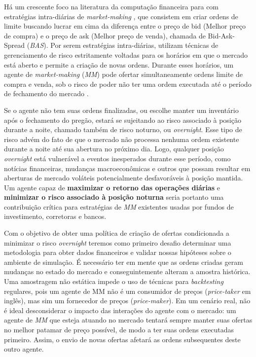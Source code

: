 Há um crescente foco na literatura da computação financeira para com estratégias intra-diárias de \textit{market-making} \citep{Gueant2017}, que consistem em criar ordens de limite buscando lucrar em cima da diferença entre o preço de bid (Melhor preço de compra) e o preço de ask (Melhor preço de venda), chamada de Bid-Ask-Spread (\textit{BAS}). Por serem estratégias intra-diárias, utilizam técnicas de gerenciamento de risco estritamente voltadas para os horários em que o mercado está aberto e permite a criação de novas ordens. Durante esses horários, um agente de \textit{market-making} (\textit{MM}) pode ofertar simultaneamente ordens limite de compra e venda, sob o risco de poder não ter uma ordem executada até o período de fechamento do mercado \citep{Gu_ant_2012} \citep{selser2021optimal} \citep{bakshaev2020marketmaking}.

Se o agente não tem suas ordens finalizadas, ou escolhe manter um inventário após o fechamento do pregão, estará se sujeitando ao risco associado à posição durante a noite, chamado também de risco noturno, ou \textit{overnight}. Esse tipo de risco advém do fato de que o mercado não processa nenhuma ordem existente durante a noite até sua abertura no próximo dia. Logo, qualquer posição \textit{overnight} está vulnerável a eventos inesperados durante esse período, como notícias financeiras, mudanças macroeconômicas e outros que possam resultar em aberturas de mercado voláteis potencialmente desfavoráveis à posição mantida. Um agente capaz de \textbf{maximizar o retorno das operações diárias} e \textbf{minimizar o risco associado à posição noturna} seria portanto uma contribuição crítica para estratégias de \textit{MM} existentes usadas por fundos de investimento, corretoras e bancos.

Com o objetivo de obter uma política de criação de ofertas condicionada a minimizar o risco \textit{overnight} teremos como primeiro desafio determinar uma metodologia para obter dados financeiros e validar nossas hipóteses sobre o ambiente de simulação. É necessário ter em mente que as ordens criadas geram mudanças no estado do mercado e conseguintemente alteram a amostra histórica. Uma amostragem não estática impede o uso de técnicas para \textit{backtesting} regulares, pois um agente de MM não é um consumidor de preços (\textit{price-taker} em inglês), mas sim um fornecedor de preços (\textit{price-maker}). Em um cenário real, não é ideal desconsiderar o impacto das interações do agente com o mercado: um agente de \textit{MM} que esteja atuando no mercado tentará sempre manter suas ofertas no melhor patamar de preço possível, de modo a ter suas ordens executadas primeiro. Assim, o envio de novas ofertas afetará as ordens subsequentes deste outro agente.

